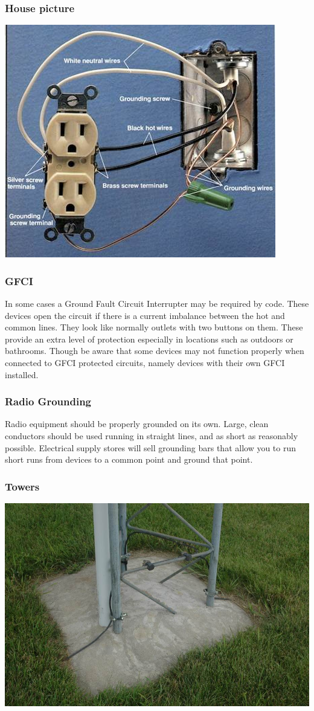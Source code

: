 \documentclass[10pt]{beamer}
\begin{document}
\begin{frame}
\frametitle{House picture}
\includegraphics[height=.9\textheight, width=.9\textwidth]{outletground.jpg}
\end{frame}

\begin{frame}
\frametitle{GFCI}
In some cases a Ground Fault Circuit Interrupter may be required by code. These devices open the circuit if there is a current imbalance between the hot and common lines. They look like normally outlets with two buttons on them. These provide an extra level of protection especially in locations such as outdoors or bathrooms. Though be aware that some devices may not function properly when connected to GFCI protected circuits, namely devices with their own GFCI installed.
\end{frame}

\begin{frame}
\frametitle{Radio Grounding}
Radio equipment should be properly grounded on its own. Large, clean conductors should be used running in straight lines, and as short as reasonably possible. Electrical supply stores will sell grounding bars that allow you to run short runs from devices to a common point and ground that point.
\end{frame}

\begin{frame}
\frametitle{Towers}
\includegraphics[height=.9\textheight, width=.9\textwidth]{towerground.jpg}
\end{frame}
\end{document}
